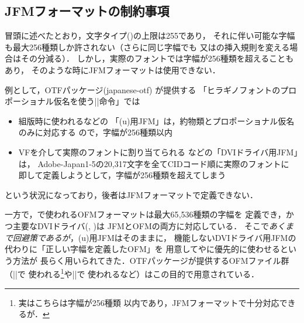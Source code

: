 \documentclass[a4paper,11pt,nomag]{jsarticle}
\begin{document}
\subsection{JFMフォーマットの制約事項}

冒頭に述べたとおり，文字タイプ()の上限は255であり，
それに伴い可能な字幅も最大256種類しか許されない（さらに同じ字幅でも
又はの挿入規則を変える場合はその分減る）．
しかし，実際のフォントでは字幅が256種類を超えることもあり，
そのような時にJFMフォーマットは使用できない．

例として，OTFパッケージ(japanese-otf) \cite{jotf}が提供する
「ヒラギノフォントのプロポーショナル仮名を使う|\propshape|命令」では
\begin{itemize}
 \item 組版時に使われるなどの
  「(u)\pTeX 用JFM」は，約物類とプロポーショナル仮名のみに対応する
  ので，字幅が256種類以内
 \item VFを介して実際のフォントに割り当てられる
  などの「DVIドライバ用JFM」は，
  Adobe-Japan1-5の20{,}317文字を全てCIDコード順に実際のフォントに
  即して定義しようとして，字幅が256種類を超えてしまう
\end{itemize}
という状況になっており，後者はJFMフォーマットで定義できない．

一方で，\OMEGA で使われるOFMフォーマットは最大65{,}536種類の字幅を
定義でき，かつ主要なDVIドライバ(, )は
JFMとOFMの両方に対応している．
そこで\emph{あくまで回避策であるが}，(u)\pTeX 用JFMはそのままに，
機能しないDVIドライバ用JFMの代わりに「正しい字幅を定義したOFM」を
用意してやに優先的に使わせるという方法が
長らく用いられてきた．OTFパッケージが提供するOFMファイル群（|\CID|で
使われる\footnote{実はこちらは字幅が256種類
以内であり，JFMフォーマットで十分対応できるが．}や|\propshape|で
使われるなど）はこの目的で用意されている\cite{cidofm}．
\end{document}

